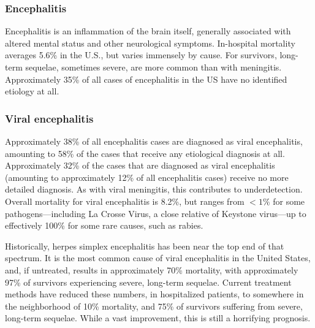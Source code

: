 \documentclass[12pt]{article}
\newcommand{\cjh}{\textcolor{blue}{cjh}}
\newcommand{\msg}[3]{(#1 $\rightarrow$ #2: #3)}
\newcommand{\mcc}[1]{\msg\cjh\cjh{#1}}
\begin{document}
        \subsubsection{Encephalitis}
            \label{encephalitis}

            Encephalitis is an inflammation of the brain itself, generally associated with altered mental status and other neurological symptoms. In-hospital mortality averages 5.6\% in the U.S., but varies immensely by cause. For survivors, long-term sequelae, sometimes severe, are more common than with meningitis. Approximately 35\% of all cases of encephalitis in the US have no identified etiology at all\cite{george2014encephalitis}.
            
        \subsubsection{Viral encephalitis}
            \label{viral-encephalitis}
            Approximately 38\% of all encephalitis cases are diagnosed as viral encephalitis, amounting to 58\% of the cases that receive any etiological diagnosis at all. Approximately 32\% of the cases that are diagnosed as viral encephalitis (amounting to approximately 12\% of all encephalitis cases) receive no more detailed diagnosis. As with viral meningitis, this contributes to underdetection. Overall mortality for viral encephalitis is 8.2\%, but ranges from $<1\%$ for some pathogens---including La Crosse Virus, a close relative of Keystone virus---up to effectively 100\% for some rare causes, such as rabies\cite{george2014encephalitis}.

            Historically, herpes simplex encephalitis has been near the top end of that spectrum. It is the most common cause of viral encephalitis in the United States, and, if untreated, results in approximately 70\% mortality, with approximately 97\% of survivors experiencing severe, long-term sequelae. Current treatment methods have reduced these numbers, in hospitalized patients, to somewhere in the neighborhood of 10\% mortality, and 75\% of survivors suffering from severe, long-term sequelae\cite{bradshaw2016herpes}. While a vast improvement, this is still a horrifying prognosis.
            
\end{document}
